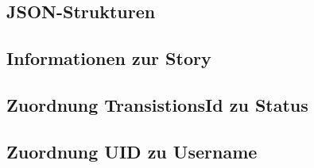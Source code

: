 \documentclass[12pt,titlepage]{scrartcl}
\begin{document}
	\newpage
 	\begin{appendix}
 		\section{JSON-Strukturen} \label{ANHJSON}
 	  		\subsection{Informationen zur Story} \label{ANHInfStory}
 	  		\subsection{Zuordnung TransistionsId zu Status} \label{ANHTransi}
 	 	 	\subsection{Zuordnung UID zu Username} \label{ANHUser}
 	 	\newpage

\end{appendix}
\end{document}

